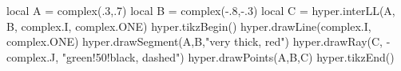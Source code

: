 \documentclass[margin=.2cm,multi,tikz]{standalone}
\begin{document}
\begin{luacode*}
local A = complex(.3,.7)
local B = complex(-.8,-.3)
local C = hyper.interLL(A, B, complex.I, complex.ONE)
hyper.tikzBegin()
hyper.drawLine(complex.I, complex.ONE)
hyper.drawSegment(A,B,"very thick, red")
hyper.drawRay(C, -complex.J, "green!50!black, dashed")
hyper.drawPoints(A,B,C)
hyper.tikzEnd()
\end{luacode*}
\end{document}

